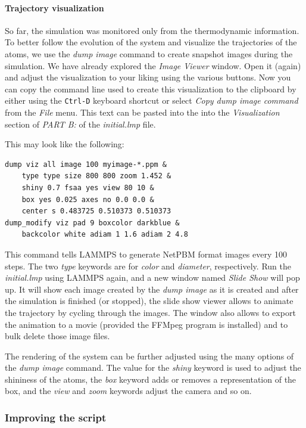 \documentclass[9pt,tutorial]{livecoms}
\begin{document}
\paragraph{Trajectory visualization}

So far, the simulation was monitored only from the thermodynamic
information.  To better follow the evolution of the system and visualize
the trajectories of the atoms, we use the \textit{dump image} command to
create snapshot images during the simulation.  We have already explored
the \textit{Image Viewer} window.  Open it (again) and adjust the
visualization to your liking using the various buttons.  Now you can
copy the command line used to create this visualization to the clipboard
by either using the \texttt{Ctrl-D} keyboard shortcut or select
\textit{Copy dump image command} from the \textit{File} menu.  This text
can be pasted into the into the \textit{Visualization} section of
\textit{PART B:} of the \textit{initial.lmp} file.

This may look like the following:
{\normalsize
\begin{verbatim}
dump viz all image 100 myimage-*.ppm &
    type type size 800 800 zoom 1.452 &
    shiny 0.7 fsaa yes view 80 10 &
    box yes 0.025 axes no 0.0 0.0 &
    center s 0.483725 0.510373 0.510373
dump_modify viz pad 9 boxcolor darkblue &
    backcolor white adiam 1 1.6 adiam 2 4.8
\end{verbatim}
}
This command tells LAMMPS to generate NetPBM format images every 100
steps. The two \textit{type} keywords are for \textit{color} and
\textit{diameter}, respectively.  Run the \textit{initial.lmp} using
LAMMPS again, and a new window named \textit{Slide Show} will pop up.
It will show each image created by the \textit {dump image} as it is
created and after the simulation is finished (or stopped), the slide
show viewer allows to animate the trajectory by cycling through the
images.  The window also allows to export the animation to a movie
(provided the FFMpeg program is installed) and to bulk delete those
image files.

The rendering of the system can be further adjusted using the many
options of the \textit{dump image} command.  The value for the
\textit{shiny} keyword is used to adjust the shininess of the atoms, the
\textit{box} keyword adds or removes a representation of the box, and
the \textit{view} and \textit{zoom} keywords adjust the camera and so
on.

\subsubsection{Improving the script}
\end{document}
